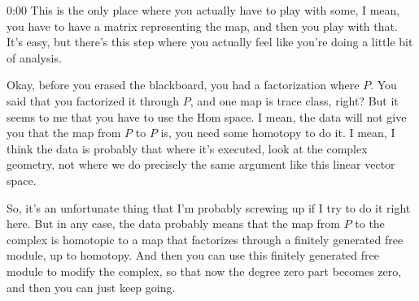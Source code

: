 \begin{unfinished}{0:00}
This is the only place where you actually have to play with some, I mean, you have to have a matrix representing the map, and then you play with that. It's easy, but there's this step where you actually feel like you're doing a little bit of analysis.

Okay, before you erased the blackboard, you had a factorization where $P$. You said that you factorized it through $P$, and one map is trace class, right? But it seems to me that you have to use the $\text{Hom}$ space. I mean, the data will not give you that the map from $P$ to $P$ is, you need some homotopy to do it. I mean, I think the data is probably that where it's executed, look at the complex geometry, not where we do precisely the same argument like this linear vector space.

So, it's an unfortunate thing that I'm probably screwing up if I try to do it right here. But in any case, the data probably means that the map from $P$ to the complex is homotopic to a map that factorizes through a finitely generated free module, up to homotopy. And then you can use this finitely generated free module to modify the complex, so that now the degree zero part becomes zero, and then you can just keep going.

\end{unfinished}